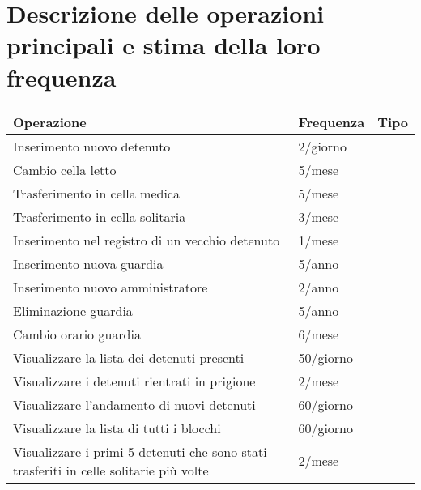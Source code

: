 \documentclass[a4paper,12pt]{report}
\begin{document}
\section{Descrizione delle operazioni principali e stima della loro frequenza}
\begin{table}[H]
\begin{tabular}{p{9cm} p{2cm} p{1cm}}
\hline
Operazione & Frequenza & Tipo \\ \hline
Inserimento nuovo detenuto & 2/giorno &  \\
Cambio cella letto & 5/mese &  \\
Trasferimento in cella medica & 5/mese & \\
Trasferimento in cella solitaria & 3/mese & \\
Inserimento nel registro di un vecchio detenuto & 1/mese & \\
Inserimento nuova guardia & 5/anno & \\
Inserimento nuovo amministratore & 2/anno & \\
Eliminazione guardia & 5/anno & \\
Cambio orario guardia & 6/mese & \\
Visualizzare la lista dei detenuti presenti & 50/giorno & \\
Visualizzare i detenuti rientrati in prigione & 2/mese & \\
Visualizzare l'andamento di nuovi detenuti & 60/giorno & \\
Visualizzare la lista di tutti i blocchi & 60/giorno & \\
Visualizzare i primi 5 detenuti che sono stati trasferiti in celle solitarie più volte & 2/mese &
\end{tabular}
\end{table}
\end{document}
